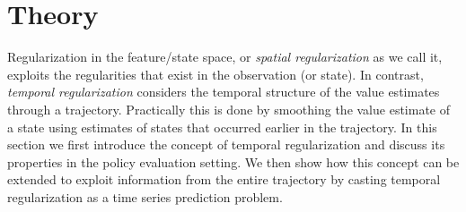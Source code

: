 \section{Theory}
Regularization in the feature/state space, or \emph{spatial regularization} as we call it, exploits the regularities that exist in the observation (or state). In contrast, \emph{temporal regularization} considers the temporal structure of the value estimates through a trajectory. Practically this is done by smoothing the value estimate of a state using estimates of states that occurred earlier in the trajectory.
In this section we first introduce the concept of temporal regularization and discuss its properties in the policy evaluation setting. We then show how this concept can be extended to exploit information from the entire trajectory by casting temporal regularization as a time series prediction problem. 
